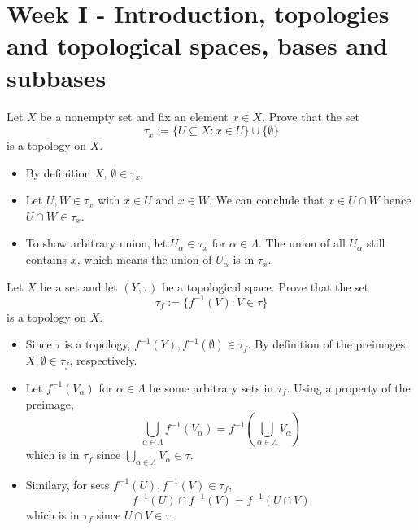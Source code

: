 \documentclass[../main.tex]{subfiles}
\begin{document}
\section{Week I - Introduction, topologies and topological spaces, bases and subbases}

\begin{problem}[1]
    Let $X$ be a nonempty set and fix an element $x \in X$.
    Prove that the set
    \[ \tau_x := \{ U \subseteq X : x \in U \} \cup \{ \emptyset \} \]
    is a topology on $X$.
\end{problem}
\begin{itemize}
    \item By definition $X$, $\emptyset \in \tau_x$.
    \item Let $U, W \in \tau_x$ with $x \in U$ and $x \in W$.
        We can conclude that $x \in U \cap W$ hence $U \cap W \in \tau_x$.
    \item To show arbitrary union, let $U_{\alpha} \in \tau_x$ for $\alpha \in \Lambda$.
        The union of all $U_{\alpha}$ still contains $x$,
        which means the union of $U_{\alpha}$ is in $\tau_x$.
\end{itemize}

\begin{problem}[2]
    Let $X$ be a set and let $(Y, \tau)$ be a topological space.
    Prove that the set
    \[ \tau_f := \{ f^{-1}(V) : V \in \tau \} \]
    is a topology on $X$.
\end{problem}
\begin{itemize}
    \item Since $\tau$ is a topology, $f^{-1}(Y), f^{-1}(\emptyset) \in \tau_f$.
        By definition of the preimages, $X, \emptyset \in \tau_f$, respectively.
    \item Let $f^{-1}(V_\alpha)$ for $\alpha \in \Lambda$ be some arbitrary sets in $\tau_f$.
        Using a property of the preimage,
        \[
            \bigcup_{\alpha \in \Lambda} f^{-1}(V_\alpha) = f^{-1}\left(\bigcup_{\alpha \in \Lambda} V_\alpha\right)
        \]
        which is in $\tau_f$ since $\bigcup_{\alpha \in \Lambda} V_\alpha \in \tau$.
    \item Similary, for sets $f^{-1}(U), f^{-1}(V) \in \tau_f$,
        \[
            f^{-1}(U) \cap f^{-1}(V) = f^{-1}(U \cap V)
        \]
        which is in $\tau_f$ since $U \cap V \in \tau$.
\end{itemize}
\end{document}
